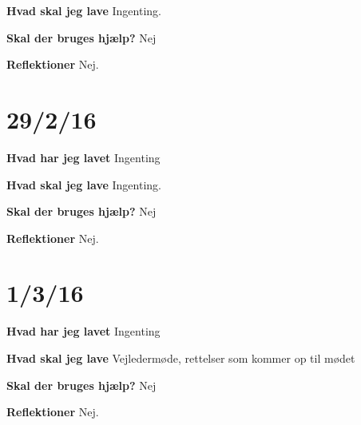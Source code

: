 \documentclass{article}
\begin{document}
	\textbf{Hvad skal jeg lave}
	Ingenting. 
	
	\textbf{Skal der bruges hjælp?}
	Nej
	
	\textbf{Reflektioner}
	Nej.		
	
	
	\section{29/2/16}
	\textbf{Hvad har jeg lavet}
	Ingenting
	
	\textbf{Hvad skal jeg lave}
	Ingenting. 
	
	\textbf{Skal der bruges hjælp?}
	Nej
	
	\textbf{Reflektioner}
	Nej.	
	
	\section{1/3/16}
	\textbf{Hvad har jeg lavet}
	Ingenting
	
	\textbf{Hvad skal jeg lave}
	Vejledermøde, rettelser som kommer op til mødet
	
	\textbf{Skal der bruges hjælp?}
	Nej
	
	\textbf{Reflektioner}
	Nej.			
\end{document}
